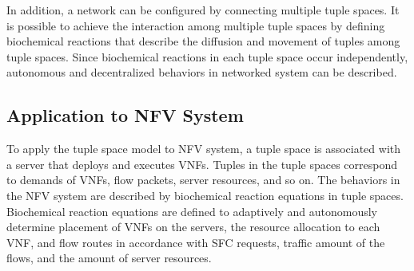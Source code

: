 \documentclass[technicalreport]{ieicej}
\begin{document}
	In addition, a network can be configured by connecting multiple tuple spaces.
	It is possible to achieve the interaction among multiple tuple spaces by defining biochemical reactions that describe the diffusion and movement of tuples among tuple spaces.
	Since biochemical reactions in each tuple space occur independently, autonomous and decentralized behaviors in networked system can be described.

	\subsection{Application to NFV System}
	To apply the tuple space model to NFV system, a tuple space is associated with a server that deploys and executes VNFs.
	Tuples in the tuple spaces correspond to demands of VNFs, flow packets, server resources, and so on.
	The behaviors in the NFV system are described by biochemical reaction equations in tuple spaces.
	Biochemical reaction equations are defined to adaptively and autonomously determine placement of VNFs on the servers, the resource allocation to each VNF, and flow routes in accordance with SFC requests, traffic amount of the flows, and the amount of server resources.
\end{document}
